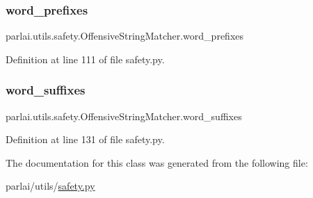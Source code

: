 \subsubsection{\texorpdfstring{word\+\_\+prefixes}{word\_prefixes}}
{\footnotesize\ttfamily parlai.\+utils.\+safety.\+Offensive\+String\+Matcher.\+word\+\_\+prefixes}



Definition at line 111 of file safety.\+py.

\mbox{\label{classparlai_1_1utils_1_1safety_1_1OffensiveStringMatcher_af474171a03d288a3d8adaa2287eedc8c}} 
\subsubsection{\texorpdfstring{word\+\_\+suffixes}{word\_suffixes}}
{\footnotesize\ttfamily parlai.\+utils.\+safety.\+Offensive\+String\+Matcher.\+word\+\_\+suffixes}



Definition at line 131 of file safety.\+py.



The documentation for this class was generated from the following file\+:\begin{DoxyCompactItemize}
\item 
parlai/utils/\hyperlink{safety_8py}{safety.\+py}\end{DoxyCompactItemize}
